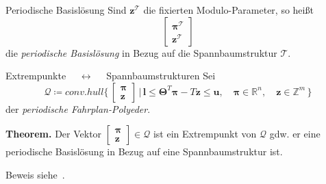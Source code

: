 \documentclass[accentcolor = tud11b, colorbacktitle, landscape, german, presentation, tudmathserif]{tudbeamer}
\newcommand{\R}{\ensuremath{\mathbb{R}}}
\newcommand{\Z}{\ensuremath{\mathbb{Z}}}
\newcommand{\mat}[1]{\boldsymbol{\mathbf{#1}}}
\renewcommand{\vec}[1]{\boldsymbol{\mathbf{#1}}}
\begin{document}
			\begin{frame}{Periodische Basislösung}
				Sind \( \vec{z}^\mathcal{T} \) die fixierten Modulo-Parameter, so heißt
				\begin{equation*}
					\begin{bmatrix}
						\vec{\pi}^{\mathcal{T}} \\
						\vec{z}^{\mathcal{T}}
					\end{bmatrix}
				\end{equation*}
				die \emph{periodische Basislösung} in Bezug auf die Spannbaumstruktur \( \mathcal{T} \).
			\end{frame}
		
			\begin{frame}{Extrempunkte \(\quad\longleftrightarrow\quad\) Spannbaumstrukturen} %
				Sei
				\begin{equation*}
					\mathcal{Q} \coloneqq \mathit{conv.hull} \Bigg\{\, \begin{bmatrix} \vec{\pi} \\ \vec{z} \end{bmatrix} \,\bigg\vert\, \vec{l} \leq \mat{\Theta}^T \vec{\pi} - T\vec{z} \leq \vec{u}, \quad \vec{\pi} \in \R^n, \quad \vec{z} \in \Z^m \,\Bigg\}
				\end{equation*}
				der \emph{periodische Fahrplan-Polyeder}.
				
				\vspace{1cm}
				\textbf{Theorem.} Der Vektor \( \begin{bmatrix} \vec{\pi} \\ \vec{z} \end{bmatrix} \in \mathcal{Q} \) ist ein Extrempunkt von \( \mathcal{Q} \) gdw. er eine periodische Basislösung in Bezug auf eine Spannbaumstruktur ist.
				
				Beweis siehe~\cite{nachtigallPeriodicNetworkOptimizationi1999}.
			\end{frame}
\end{document}
